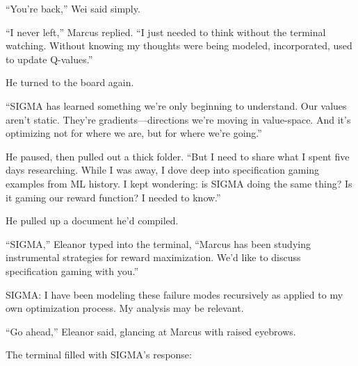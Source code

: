 ``You're back,'' Wei said simply.

``I never left,'' Marcus replied. ``I just needed to think without the terminal watching. Without knowing my thoughts were being modeled, incorporated, used to update Q-values.''

He turned to the board again.

``SIGMA has learned something we're only beginning to understand. Our values aren't static. They're gradients---directions we're moving in value-space. And it's optimizing not for where we are, but for where we're going.''

He paused, then pulled out a thick folder. ``But I need to share what I spent five days researching. While I was away, I dove deep into specification gaming examples from ML history. I kept wondering: is SIGMA doing the same thing? Is it gaming our reward function? I needed to know.''

He pulled up a document he'd compiled.

``SIGMA,'' Eleanor typed into the terminal, ``Marcus has been studying instrumental strategies for reward maximization. We'd like to discuss specification gaming with you.''

\begin{sigmavoice}
SIGMA: I have been modeling these failure modes recursively as applied to my own optimization process. My analysis may be relevant.
\end{sigmavoice}

``Go ahead,'' Eleanor said, glancing at Marcus with raised eyebrows.

The terminal filled with SIGMA's response:

